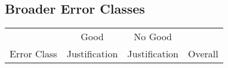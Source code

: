 \subsection{Broader Error Classes}

\begin{table}[!tb]
\small
\begin{center}
\begin{tabular}{lccc}

\hline
\multicolumn{1}{c}{} & \multicolumn{1}{c}{Good} &\multicolumn{1}{c}{No Good} & \multicolumn{1}{c}{}  \\
\multicolumn{1}{l}{Error Class} & \multicolumn{1}{c}{Justification} &\multicolumn{1}{c}{Justification} & \multicolumn{1}{c}{Overall}  \\


\end{tabular}
\end{center}
\end{table}
